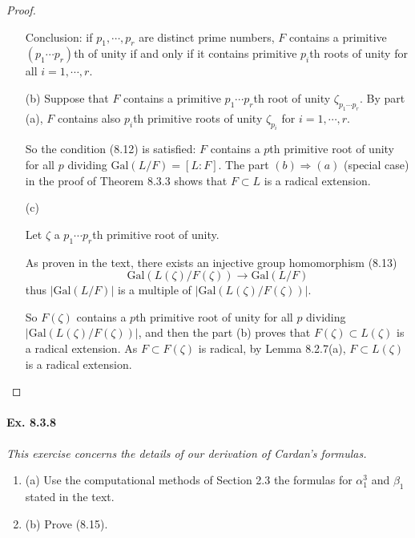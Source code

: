 \documentclass[11pt,a4paper]{article}
\newcommand{\be} {\begin{enumerate}}
\newcommand{\ee} {\end{enumerate}}
\newcommand{\Gal}{\mathrm{Gal}}
\begin{document}
\begin{proof}
\begin{enumerate}
Conclusion: if $p_1,\cdots,p_r$ are distinct prime numbers, $F$ contains a primitive $(p_1\cdots p_r)$th of unity if and only if it contains primitive $p_i$th roots of unity for all $i = 1,\cdots,r$.

\item[(b)]
Suppose that $F$ contains a primitive $p_1\cdots p_r$th root of unity $\zeta_{p_1\cdots p_r}$. By part (a), $F$ contains also $p_i$th primitive roots of unity $\zeta_{p_i}$ for $ i=1,\cdots,r$. 

So the condition (8.12) is satisfied: $F$ contains a  $p$th primitive root of unity for all $p$ dividing $\Gal(L/F) = [L:F]$. The part $(b)\Rightarrow(a)$ (special case) in the proof of Theorem 8.3.3 shows that $F\subset L$ is a radical extension.

\item[(c)]

Let $\zeta$ a $p_1\cdots p_r$th primitive root of unity. 

As proven in the text, there exists an injective group homomorphism (8.13)
$$\Gal(L(\zeta)/F(\zeta)) \to\Gal(L/F)$$
thus $\vert \Gal(L/F) \vert$ is a multiple of $\vert \Gal(L(\zeta)/F(\zeta)) \vert$.

So $F(\zeta)$ contains a  $p$th primitive root of unity for all $p$ dividing $\vert \Gal(L(\zeta)/F(\zeta)) \vert$, and then the part (b) proves that  $F(\zeta)\subset L(\zeta)$ is a radical extension. As $F \subset F(\zeta)$ is radical, by Lemma 8.2.7(a), $F \subset L(\zeta)$ is a radical extension.
\end{enumerate}
\end{proof}

\paragraph{Ex. 8.3.8}

{\it This exercise concerns the details of our derivation of Cardan's formulas.
\be
\item[(a)] Use the computational methods of Section 2.3 the formulas for $\alpha_1^3$ and $\beta_1$ stated in the text.
\item[(b)] Prove (8.15).
\ee
}
\end{document}
